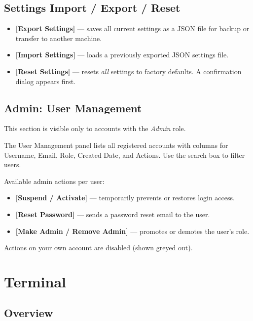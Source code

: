 \documentclass[12pt,a4paper]{report}
\newcommand{\btn}[1]{\textbf{\textcolor{primary}{[#1]}}}
\begin{document}
\section{Settings Import / Export / Reset}

\begin{itemize}[leftmargin=1.5em]
  \item \btn{Export Settings} — saves all current settings as a JSON file for backup or transfer to another machine.
  \item \btn{Import Settings} — loads a previously exported JSON settings file.
  \item \btn{Reset Settings} — resets \textit{all} settings to factory defaults. A confirmation dialog appears first.
\end{itemize}

\section{Admin: User Management}

\begin{notebox}
  This section is visible only to accounts with the \textit{Admin} role.
\end{notebox}

The User Management panel lists all registered accounts with columns for Username, Email, Role, Created Date, and Actions. Use the search box to filter users.

Available admin actions per user:

\begin{itemize}[leftmargin=1.5em]
  \item \btn{Suspend / Activate} — temporarily prevents or restores login access.
  \item \btn{Reset Password} — sends a password reset email to the user.
  \item \btn{Make Admin / Remove Admin} — promotes or demotes the user's role.
\end{itemize}

Actions on your own account are disabled (shown greyed out).

\chapter{Terminal}

\section{Overview}
\end{document}
